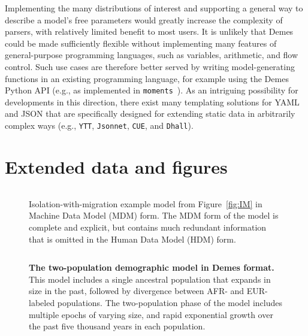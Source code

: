 \documentclass[11pt]{article}
\newcommand{\moments}[0]{\texttt{moments}}
\newcommand{\ggcomment}[1]{{\textcolor{yellow!60!red}{GG: #1}}}
\begin{document}
Implementing the many distributions of interest and supporting a general
way to describe a model's free parameters would greatly increase the
complexity of parsers, with relatively limited benefit to most users.
It is unlikely that Demes could be made sufficiently
flexible without implementing many features of
general-purpose programming languages, such as variables, arithmetic,
and flow control.
Such use cases are therefore better served by writing model-generating
functions in an existing programming language, for example
using the Demes Python API (e.g., as implemented in \moments\
\citep{jouganous2017inferring,ragsdale2019models}).
As an intriguing possibility for developments in this direction,
there exist many templating solutions for YAML and JSON that are
specifically designed for extending static data in arbitrarily complex ways
(e.g., \texttt{YTT}, \texttt{Jsonnet}, \texttt{CUE}, and \texttt{Dhall}).


\section{Extended data and figures}
\label{sec:appendix-figures}

\begin{figure}[h!]
    \begin{tcolorbox}
        \inputminted[fontsize=\scriptsize,numbersep=5pt]{yaml}{models/IM-resolved.yaml}
    \end{tcolorbox}
    \caption{
        \label{fig:IM-MDM}
        Isolation-with-migration example model from Figure~\ref{fig:IM}
        in Machine Data Model (MDM) form.
        The MDM form of the model is complete and explicit, but contains
        much redundant information that is omitted in the Human Data Model
        (HDM) form.
    }
\end{figure}

\begin{figure}[h!]
    \begin{tcolorbox}
        \inputminted[fontsize=\scriptsize,numbersep=5pt]{yaml}{models/tennessen.yaml}
    \end{tcolorbox}
    \caption{
        \textbf{The \citet{tennessen2012evolution} two-population
        demographic model in Demes format.}
        This model includes a single ancestral population that expands in
        size in the past, followed by divergence between AFR- and EUR-labeled
        populations. The two-population phase of the model includes multiple
        epochs of varying size, and rapid exponential growth over the past
        five thousand years in each population.
    }
    \label{fig:tennessen}
\end{figure}
\end{document}
